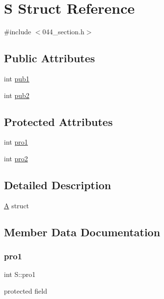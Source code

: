 \hypertarget{struct_s}{}\section{S Struct Reference}
\label{struct_s}


{\ttfamily \#include $<$044\+\_\+section.\+h$>$}

\subsection*{Public Attributes}
\begin{DoxyCompactItemize}
\item 
int \mbox{\hyperlink{struct_s_aff6062601582dff52ace76d285c2e504}{pub1}}
\item 
int \mbox{\hyperlink{struct_s_a413054db7785010db38c16322c8583cc}{pub2}}
\end{DoxyCompactItemize}
\subsection*{Protected Attributes}
\begin{DoxyCompactItemize}
\item 
int \mbox{\hyperlink{struct_s_ac506df106f05b04ac31b3b6ae1357067}{pro1}}
\item 
int \mbox{\hyperlink{struct_s_a0c535a6122f4ae509a336e3a67f927a4}{pro2}}
\end{DoxyCompactItemize}


\subsection{Detailed Description}
\mbox{\hyperlink{class_a}{A}} struct 

\subsection{Member Data Documentation}
\mbox{\label{struct_s_ac506df106f05b04ac31b3b6ae1357067}} 
\subsubsection{\texorpdfstring{pro1}{pro1}}
{\footnotesize\ttfamily int S\+::pro1\hspace{0.3cm}{\ttfamily [protected]}}

protected field \mbox{\label{struct_s_a0c535a6122f4ae509a336e3a67f927a4}} 
